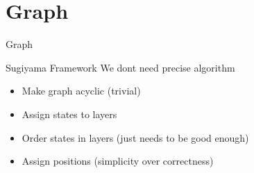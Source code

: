 \begin{frame}
    
    
\end{frame}

\section{Graph}
\begin{frame}[shrink=5]{Graph}
    \begin{center}
        
    \end{center}
\end{frame}
\begin{frame}{Sugiyama Framework}
    We dont need precise algorithm
    \begin{itemize}
        \item Make graph acyclic (trivial)
        \item Assign states to layers
        \item Order states in layers (just needs to be good enough)
        \item Assign positions (simplicity over correctness)
    \end{itemize}
\end{frame}

